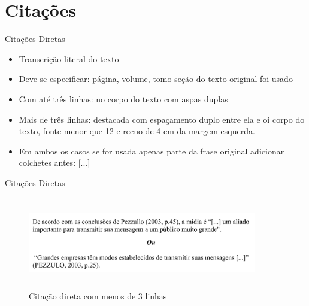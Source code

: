 \section{Citações}

\begin{frame}	
	\begin{block}{Citações Diretas}	
		\begin{itemize}
			\item Transcrição literal do texto
			\item Deve-se especificar: página, volume, tomo seção do texto original foi usado
			\item Com até três linhas: no corpo do texto com aspas duplas
			\item Mais de três linhas: destacada com espaçamento duplo entre ela e oi corpo do texto, fonte menor que 12 e recuo de 4 cm da margem esquerda.
			\item Em ambos os casos se for usada apenas parte da frase original adicionar colchetes antes: [...]
		\end{itemize}
	\end{block}
\end{frame}

\begin{frame}	
	\begin{block}{Citações Diretas}	
		 \begin{figure}[!htb]
			\centering	  				
			\includegraphics[height=4cm, width = 10cm]{./pic/diretamenos3linhas.png}
			\caption{Citação direta com menos de 3 linhas \cite{GUIA_SENAC}}
			\label{fig_citacaodiretamenos3linhas}
		\end{figure}
	\end{block}
\end{frame}

